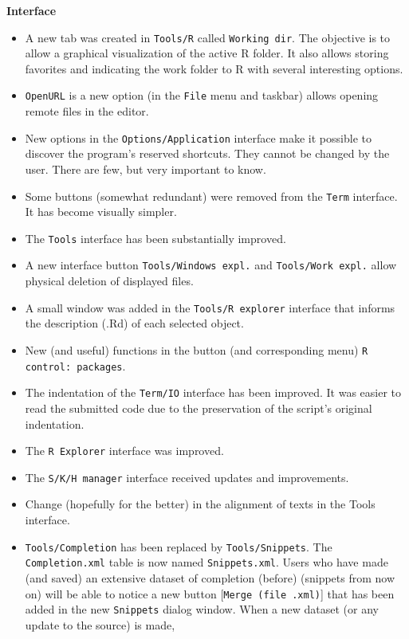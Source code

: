 \textbf{Interface}
\begin{itemize}
  \item A new tab was created in \texttt{Tools/R} called \texttt{Working dir}.
   The objective is to allow a graphical visualization of the active R folder.
   It also allows storing favorites and indicating the work folder to R with several interesting options.
  \item \texttt{OpenURL} is a new option (in the \texttt{File} menu and taskbar) allows opening
   remote files in the editor.
  \item New options in the \texttt{Options/Application} interface make it possible to discover the program's
   reserved shortcuts. They cannot be changed by the user. There are few, but very important to know.
  \item Some buttons (somewhat redundant) were removed from the \texttt{Term} interface.
   It has become visually simpler.
  \item The \texttt{Tools} interface has been substantially improved.
  \item A new interface button \texttt{Tools/Windows expl.} and \texttt{Tools/Work expl.} allow physical
   deletion of displayed files.
  \item A small window was added in the \texttt{Tools/R explorer} interface that informs the
   description (.Rd) of each selected object.
  \item New (and useful) functions in the button (and corresponding menu) \texttt{R control: packages}.
  \item The indentation of the \texttt{Term/IO} interface has been improved. It was easier to read the
   submitted code due to the preservation of the script's original indentation.
  \item The \texttt{R Explorer} interface was improved.
  \item The \texttt{S/K/H manager} interface received updates and improvements.
  \item Change (hopefully for the better) in the alignment of texts in the Tools interface.
  \item \texttt{Tools/Completion} has been replaced by \texttt{Tools/Snippets}. The \texttt{Completion.xml}
   table is now named \texttt{Snippets.xml}. Users who have made (and saved) an extensive dataset of completion
   (before) (snippets from now on) will be able to notice a new button [\texttt{Merge (file .xml)}] that has been added
   in the new \texttt{Snippets} dialog window. When a new dataset (or any update to the source) is made,

\end{itemize}
